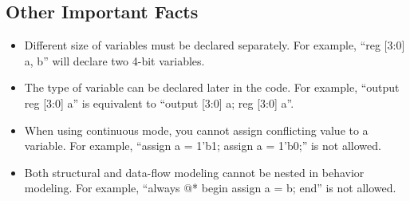 \documentclass[a4paper,12pt]{article}
\begin{document}
\subsection{Other Important Facts}

\begin{itemize}
	\item Different size of variables must be declared separately.
	      For example, ``reg [3:0] a, b'' will declare two 4-bit variables.
	\item The type of variable can be declared later in the code.
	      For example, ``output reg [3:0] a'' is equivalent to ``output [3:0] a; reg [3:0] a''.
	\item When using continuous mode, you cannot assign conflicting value to a variable. 
	      For example, ``assign a = 1'b1; assign a = 1'b0;'' is not allowed.
	\item Both structural and data-flow modeling cannot be nested in behavior modeling.
	      For example, ``always @* begin assign a = b; end'' is not allowed.
\end{itemize}
\end{document}
